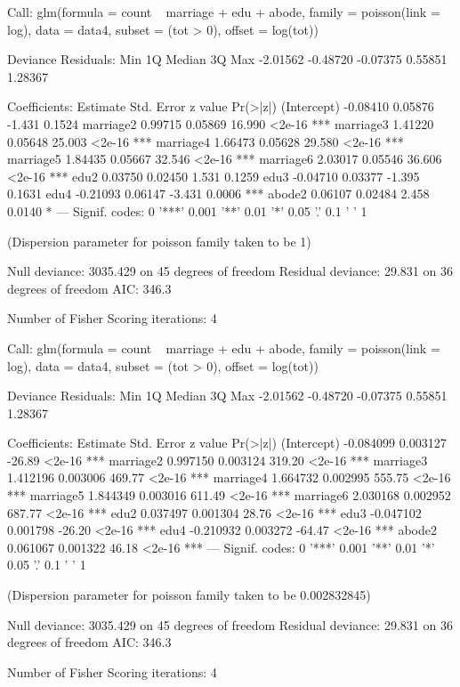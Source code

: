 \documentclass{article}
\begin{document}
\begin{Schunk}
\begin{Soutput}
Call:
glm(formula = count ~ marriage + edu + abode, family = poisson(link = log), 
    data = data4, subset = (tot > 0), offset = log(tot))

Deviance Residuals: 
     Min        1Q    Median        3Q       Max  
-2.01562  -0.48720  -0.07375   0.55851   1.28367  

Coefficients:
            Estimate Std. Error z value Pr(>|z|)    
(Intercept) -0.08410    0.05876  -1.431   0.1524    
marriage2    0.99715    0.05869  16.990   <2e-16 ***
marriage3    1.41220    0.05648  25.003   <2e-16 ***
marriage4    1.66473    0.05628  29.580   <2e-16 ***
marriage5    1.84435    0.05667  32.546   <2e-16 ***
marriage6    2.03017    0.05546  36.606   <2e-16 ***
edu2         0.03750    0.02450   1.531   0.1259    
edu3        -0.04710    0.03377  -1.395   0.1631    
edu4        -0.21093    0.06147  -3.431   0.0006 ***
abode2       0.06107    0.02484   2.458   0.0140 *  
---
Signif. codes:  0 '***' 0.001 '**' 0.01 '*' 0.05 '.' 0.1 ' ' 1

(Dispersion parameter for poisson family taken to be 1)

    Null deviance: 3035.429  on 45  degrees of freedom
Residual deviance:   29.831  on 36  degrees of freedom
AIC: 346.3

Number of Fisher Scoring iterations: 4
\end{Soutput}
\begin{Soutput}
Call:
glm(formula = count ~ marriage + edu + abode, family = poisson(link = log), 
    data = data4, subset = (tot > 0), offset = log(tot))

Deviance Residuals: 
     Min        1Q    Median        3Q       Max  
-2.01562  -0.48720  -0.07375   0.55851   1.28367  

Coefficients:
             Estimate Std. Error z value Pr(>|z|)    
(Intercept) -0.084099   0.003127  -26.89   <2e-16 ***
marriage2    0.997150   0.003124  319.20   <2e-16 ***
marriage3    1.412196   0.003006  469.77   <2e-16 ***
marriage4    1.664732   0.002995  555.75   <2e-16 ***
marriage5    1.844349   0.003016  611.49   <2e-16 ***
marriage6    2.030168   0.002952  687.77   <2e-16 ***
edu2         0.037497   0.001304   28.76   <2e-16 ***
edu3        -0.047102   0.001798  -26.20   <2e-16 ***
edu4        -0.210932   0.003272  -64.47   <2e-16 ***
abode2       0.061067   0.001322   46.18   <2e-16 ***
---
Signif. codes:  0 '***' 0.001 '**' 0.01 '*' 0.05 '.' 0.1 ' ' 1

(Dispersion parameter for poisson family taken to be 0.002832845)

    Null deviance: 3035.429  on 45  degrees of freedom
Residual deviance:   29.831  on 36  degrees of freedom
AIC: 346.3

Number of Fisher Scoring iterations: 4
\end{Soutput}
\end{Schunk}
\end{document}
